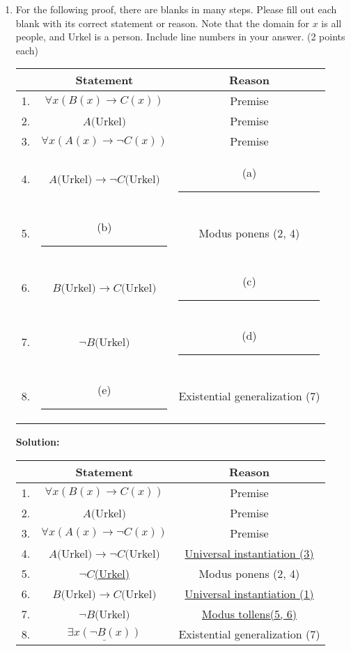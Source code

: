 \documentclass{article}
\newenvironment{solution}
{
\par
\color{blue}
\textbf{Solution:}
}
{
\par
}
\begin{document}
\begin{enumerate}
    \newpage
    \color{black}
    \item{For the following proof, there are blanks in many steps. Please fill out each blank with its correct statement or reason. Note that the domain for $x$ is all people, and Urkel is a person. Include line numbers in your answer. \hfill\hfill \color{blue}(2 points each)}\
    \begin{center}
    \renewcommand{\arraystretch}{2}
    \begin{tabular}{rc|c}
        & \textbf{Statement} & \textbf{Reason} \\\hline
        1. & $\forall x (B(x) \to C(x))$ & Premise \\
        2. & $A($Urkel$)$ & Premise  \\
        3. & $\forall x (A(x) \to \lnot C(x))$ & Premise\\
        4. & $A($Urkel$) \to \lnot C($Urkel$)$ & (a) \rule{4cm}{0.15mm}  \\
        5. & (b) \rule{4cm}{0.15mm}  & Modus ponens (2, 4)\\
        6. & $B($Urkel$) \to C($Urkel$)$ & (c) \rule{4cm}{0.15mm}\\
        7. & $\lnot B($Urkel$)$ & (d) \rule{4cm}{0.15mm}\\
        8. & (e) \rule{4cm}{0.15mm} & Existential generalization (7)
    \end{tabular}
    \end{center}
    \color{blue}
    \begin{solution}
    \begin{center}
    \renewcommand{\arraystretch}{2}
    \begin{tabular}{rc|c}
        & \textbf{Statement} & \textbf{Reason} \\\hline
        1. & $\forall x (B(x) \to C(x))$ & Premise \\
        2. & $A($Urkel$)$ & Premise  \\
        3. & $\forall x (A(x) \to \lnot C(x))$ & Premise\\
        4. & $A($Urkel$) \to \lnot C($Urkel$)$ & \underline{Universal instantiation (3)}  \\
        5. & \underline{$\lnot C$(Urkel)} & Modus ponens (2, 4)\\
        6. & $B($Urkel$) \to C($Urkel$)$ & \underline{Universal instantiation (1)}\\
        7. & $\lnot B($Urkel$)$ & \underline{Modus tollens(5, 6)}\\
        8. & $\underline{\exists x (\lnot B(x))}$ & Existential generalization (7)
    \end{tabular}
    \end{center} 
    \end{solution}
    \newpage{}
    \color{black}
    


\end{enumerate}
\end{document}
